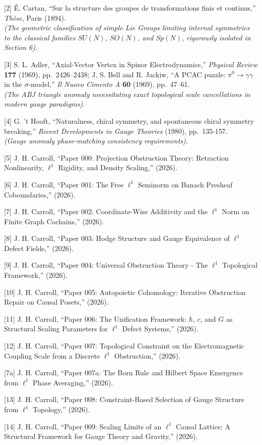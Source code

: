 \documentclass[
]{article}
\begin{document}
{[}2{]} É. Cartan, ``Sur la structure des groupes de transformations
finis et continus,'' \emph{Thèse}, Paris (1894).\\
\emph{(The geometric classification of simple Lie Groups limiting
internal symmetries to the classical families \(SU(N)\), \(SO(N)\), and
\(Sp(N)\), rigorously isolated in Section 6).}

{[}3{]} S. L. Adler, ``Axial-Vector Vertex in Spinor Electrodynamics,''
\emph{Physical Review} \textbf{177} (1969), pp.~2426--2438; J. S. Bell
and R. Jackiw, ``A PCAC puzzle: \(\pi^0 \to \gamma\gamma\) in the
\(\sigma\)-model,'' \emph{Il Nuovo Cimento A} \textbf{60} (1969),
pp.~47--61.\\
\emph{(The ABJ triangle anomaly necessitating exact topological scale
cancellations in modern gauge paradigms).}

{[}4{]} G. 't Hooft, ``Naturalness, chiral symmetry, and spontaneous
chiral symmetry breaking,'' \emph{Recent Developments in Gauge Theories}
(1980), pp.~135-157.\\
\emph{(Gauge anomaly phase-matching consistency requirements).}

{[}5{]} J. H. Carroll, ``Paper 000: Projection Obstruction Theory:
Retraction Nonlinearity, \(\ell^1\) Rigidity, and Density Scaling,''
(2026).

{[}6{]} J. H. Carroll, ``Paper 001: The Free \(\ell^1\) Seminorm on
Banach Presheaf Coboundaries,'' (2026).

{[}7{]} J. H. Carroll, ``Paper 002: Coordinate-Wise Additivity and the
\(\ell^1\) Norm on Finite Graph Cochains,'' (2026).

{[}8{]} J. H. Carroll, ``Paper 003: Hodge Structure and Gauge
Equivalence of \(\ell^1\) Defect Fields,'' (2026).

{[}9{]} J. H. Carroll, ``Paper 004: Universal Obstruction Theory - The
\(\ell^1\) Topological Framework,'' (2026).

{[}10{]} J. H. Carroll, ``Paper 005: Autopoietic Cohomology: Iterative
Obstruction Repair on Causal Posets,'' (2026).

{[}11{]} J. H. Carroll, ``Paper 006: The Unification Framework:
\(\hbar\), \(c\), and \(G\) as Structural Scaling Parameters for
\(\ell^1\) Defect Systems,'' (2026).

{[}12{]} J. H. Carroll, ``Paper 007: Topological Constraint on the
Electromagnetic Coupling Scale from a Discrete \(\ell^1\) Obstruction,''
(2026).

{[}7a{]} J. H. Carroll, ``Paper 007a: The Born Rule and Hilbert Space
Emergence from \(\ell^1\) Phase Averaging,'' (2026).

{[}13{]} J. H. Carroll, ``Paper 008: Constraint-Based Selection of Gauge
Structure from \(\ell^1\) Topology,'' (2026).

{[}14{]} J. H. Carroll, ``Paper 009: Scaling Limits of an \(\ell^1\)
Causal Lattice: A Structural Framework for Gauge Theory and Gravity,''
(2026).
\end{document}
